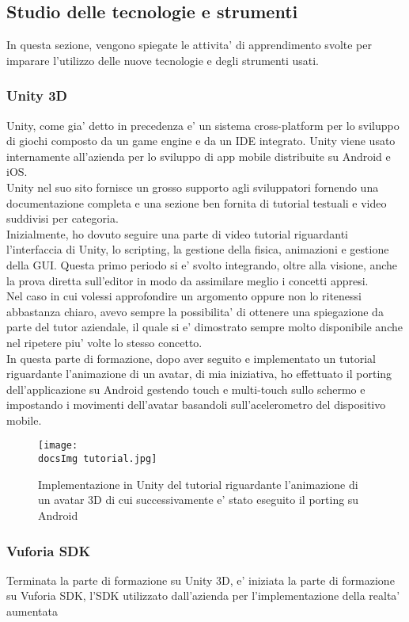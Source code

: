 \subsection{Studio delle tecnologie e strumenti}
In questa sezione, vengono spiegate le attivita' di apprendimento svolte per imparare l'utilizzo delle nuove tecnologie e degli strumenti usati.
\subsubsection{Unity 3D}
Unity, come gia' detto in precedenza e' un sistema cross-platform per lo sviluppo di giochi composto da un game engine e da un IDE integrato. Unity viene usato internamente all'azienda per lo sviluppo di app mobile distribuite su Android e iOS.
\\
Unity nel suo sito fornisce un grosso supporto agli sviluppatori fornendo una documentazione completa e una sezione ben fornita di tutorial testuali e video suddivisi per categoria.\\
Inizialmente, ho dovuto seguire una parte di video tutorial riguardanti l'interfaccia di Unity, lo scripting, la gestione della fisica, animazioni e gestione della GUI. Questa primo periodo si e' svolto integrando, oltre alla visione, anche la prova diretta sull'editor in modo da assimilare meglio i concetti appresi.\\
Nel caso in cui volessi approfondire un argomento oppure non lo ritenessi abbastanza chiaro, avevo sempre la possibilita' di ottenere una spiegazione da parte del tutor aziendale, il quale si e' dimostrato sempre molto disponibile anche nel ripetere piu' volte lo stesso concetto.\\
In questa parte di formazione, dopo aver seguito e implementato un tutorial riguardante l'animazione di un avatar, di mia iniziativa, ho effettuato il porting dell'applicazione su Android gestendo touch e multi-touch sullo schermo e impostando i movimenti dell'avatar basandoli sull'acelerometro del dispositivo mobile.

\begin{figure}[H]
	\centering
	\texttt{[image: \\docsImg tutorial.jpg]}
	\caption{Implementazione in Unity del tutorial riguardante l'animazione di un avatar 3D di cui successivamente e' stato eseguito il porting su Android}
	\label{fig:tutorial riguardante l'animazione di un avatar 3D}
\end{figure}
 
\subsubsection{Vuforia SDK}
Terminata la parte di formazione su Unity 3D, e' iniziata la parte di formazione su Vuforia SDK, l'SDK utilizzato dall'azienda per l'implementazione della realta' aumentata
